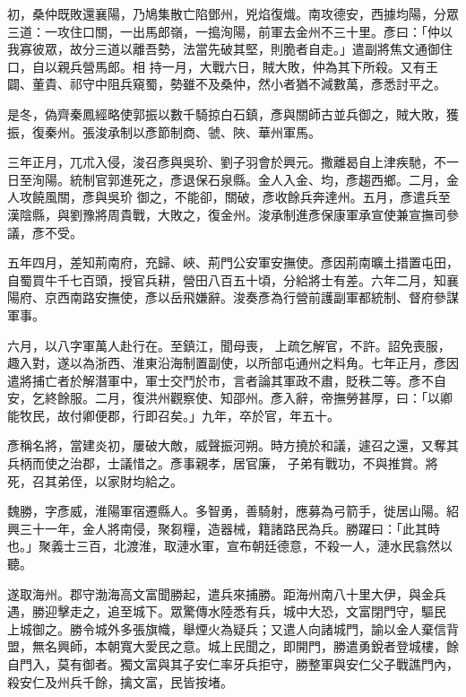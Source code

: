 \begin{pinyinscope}
 初，桑仲既敗還襄陽，乃鳩集散亡陷鄧州，兇焰復熾。南攻德安，西據均陽，分眾三道：一攻住口關，一出馬郎嶺，一搗洵陽，前軍去金州不三十里。彥曰：「仲以我寡彼眾，故分三道以離吾勢，法當先破其堅，則脆者自走。」遣副將焦文通御住口，自以親兵營馬郎。相
 持一月，大戰六日，賊大敗，仲為其下所殺。又有王闢、董貴、祁守中阻兵窺蜀，勢雖不及桑仲，然小者猶不減數萬，彥悉討平之。



 是冬，偽齊秦鳳經略使郭振以數千騎掠白石鎮，彥與關師古並兵御之，賊大敗，獲振，復秦州。張浚承制以彥節制商、虢、陜、華州軍馬。



 三年正月，兀朮入侵，浚召彥與吳玠、劉子羽會於興元。撒離曷自上津疾馳，不一日至洵陽。統制官郭進死之，彥退保石泉縣。金人入金、均，彥趨西鄉。二月，金人攻饒風關，彥與吳玠
 御之，不能卻，關破，彥收餘兵奔達州。五月，彥遣兵至漢陰縣，與劉豫將周貴戰，大敗之，復金州。浚承制進彥保康軍承宣使兼宣撫司參議，彥不受。



 五年四月，差知荊南府，充歸、峽、荊門公安軍安撫使。彥因荊南曠土措置屯田，自蜀買牛千七百頭，授官兵耕，營田八百五十頃，分給將士有差。六年二月，知襄陽府、京西南路安撫使，彥以岳飛嫌辭。浚奏彥為行營前護副軍都統制、督府參謀軍事。



 六月，以八字軍萬人赴行在。至鎮江，聞母喪，
 上疏乞解官，不許。詔免喪服，趣入對，遂以為浙西、淮東沿海制置副使，以所部屯通州之料角。七年正月，彥因遣將捕亡者於解潛軍中，軍士交鬥於市，言者論其軍政不肅，貶秩二等。彥不自安，乞終餘服。二月，復洪州觀察使、知邵州。彥入辭，帝撫勞甚厚，曰：「以卿能牧民，故付卿便郡，行即召矣。」九年，卒於官，年五十。



 彥稱名將，當建炎初，屢破大敵，威聲振河朔。時方撓於和議，遽召之還，又奪其兵柄而使之治郡，士議惜之。彥事親孝，居官廉，
 子弟有戰功，不與推賞。將死，召其弟侄，以家財均給之。



 魏勝，字彥威，淮陽軍宿遷縣人。多智勇，善騎射，應募為弓箭手，徙居山陽。紹興三十一年，金人將南侵，聚芻糧，造器械，籍諸路民為兵。勝躍曰：「此其時也。」聚義士三百，北渡淮，取漣水軍，宣布朝廷德意，不殺一人，漣水民翕然以聽。



 遂取海州。郡守渤海高文富聞勝起，遣兵來捕勝。距海州南八十里大伊，與金兵遇，勝迎擊走之，追至城下。眾驚傳水陸悉有兵，城中大恐，文富閉門守，驅民
 上城御之。勝令城外多張旗幟，舉煙火為疑兵；又遣人向諸城門，諭以金人棄信背盟，無名興師，本朝寬大愛民之意。城上民聞之，即開門，勝遣勇銳者登城樓，餘自門入，莫有御者。獨文富與其子安仁率牙兵拒守，勝整軍與安仁父子戰譙門內，殺安仁及州兵千餘，擒文富，民皆按堵。




\end{pinyinscope}
